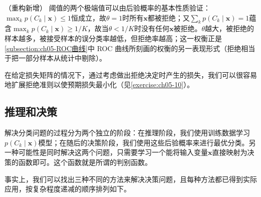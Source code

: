 \documentclass[../../main.tex]{subfiles}
\begin{document}
\begin{remark}（重构新增）
阈值的两个极端值可以由后验概率的基本性质验证：$\max_k p(C_k\mid\boldsymbol{x})\leqslant 1$恒成立，故$\theta=1$时所有$\boldsymbol{x}$都被拒绝；又$\sum_k p(C_k\mid\boldsymbol{x})=1$蕴含$\max_k p(C_k\mid\boldsymbol{x})\geqslant 1/K$，故当$\theta<1/K$时没有任何$\boldsymbol{x}$被拒绝。$\theta$越大，被拒绝的样本越多，被接受样本的误分类率越低，但拒绝率越高；这一权衡正是\cref{subsection:ch05-ROC曲线}中 ROC 曲线所刻画的权衡的另一表现形式（拒绝相当于把一部分样本从统计中剔除）。
\end{remark}

在给定损失矩阵的情况下，通过考虑做出拒绝决定时产生的损失，我们可以很容易地扩展拒绝准则以使预期损失最小化（见\cref{exercise:ch05-10}）。

\subsection{推理和决策}\label{subsection:ch05-推理和决策}

解决分类问题的过程分为两个独立的阶段：在推理阶段，我们使用训练数据学习$p(C_k\mid\boldsymbol{x})$模型；在随后的决策阶段，我们使用这些后验概率来进行最优分类。另一种可能性是同时解决这两个问题，只需要学习一个能将输入变量$\boldsymbol{x}$直接映射为决策的函数即可。这个函数就是所谓的判别函数。

事实上，我们可以找出三种不同的方法来解决决策问题，且每种方法都已得到实际应用，按复杂程度递减的顺序排列如下。
\end{document}
